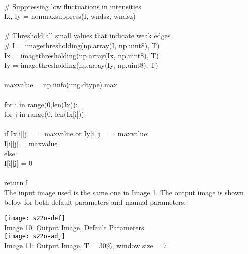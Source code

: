 \documentclass{article}
\begin{document}
	  \\
	\indent \# Suppressing low fluctuations in intensities\\
	\indent I\textunderscore x, I\textunderscore y = non\textunderscore max\textunderscore suppress(I, wndsz, wndsz)\\
	\\
	\indent \# Threshold all small values that indicate weak edges\\
	\indent \# I = image\textunderscore thresholding(np.array(I, np.uint8), T)\\
	\indent I\textunderscore x = image\textunderscore thresholding(np.array(I\textunderscore x, np.uint8), T)\\
	\indent I\textunderscore y = image\textunderscore thresholding(np.array(I\textunderscore y, np.uint8), T)\\
	\\
	\indent max\textunderscore value = np.iinfo(img.dtype).max\\
	\\
	\indent for i in range(0,len(I\textunderscore x)):\\
	\indent \indent for j in range(0, len(I\textunderscore x[i])):\\
	\\
	\indent \indent \indent if I\textunderscore x[i][j] == max\textunderscore value or I\textunderscore y[i][j] == max\textunderscore value:\\
	\indent \indent \indent \indent I[i][j] = max\textunderscore value\\
	\indent \indent \indent else:\\
	\indent \indent \indent I[i][j] = 0\\
	\\
	\indent return I\\
	
	The input image used is the same one in Image 1. The output image is shown below for both default parameters and manual parameters:\\
	
	\begin{center}
		\noindent \texttt{[image: s22o-def]}\\
		Image 10: Output Image, Default Parameters\\
		
		\texttt{[image: s22o-adj]}\\
		Image 11: Output Image, T = 30\%, window size = 7 \\
		
	\end{center}
\end{document}

